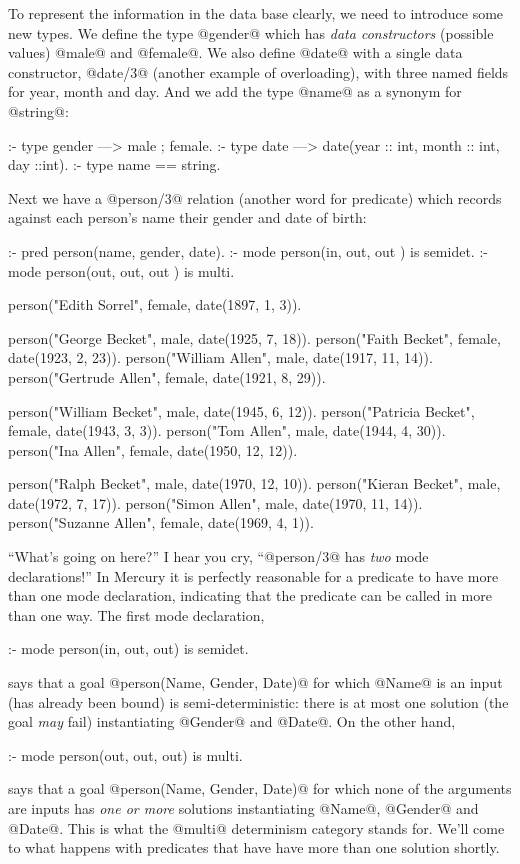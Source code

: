 To represent the information in the data base clearly, we need to introduce
some new types.  We define the type @gender@ which has \emph{data
constructors} (\ie possible values) @male@ and @female@.  We also
define @date@ with a single data constructor, @date/3@ (another
example of overloading), with three named fields for year, month and day.
And we add the type @name@ as a synonym for @string@:
\begin{myverbatim}
:- type gender ---> male ; female.
:- type date   ---> date(year :: int, month :: int, day ::int).
:- type name   ==   string.
\end{myverbatim}
Next we have a @person/3@ relation (another word for predicate) which
records against each person's name their gender and date of birth:
\begin{myverbatim}
:- pred person(name, gender, date).
:- mode person(in,   out,    out ) is semidet.
:- mode person(out,  out,    out ) is multi.

person("Edith Sorrel",      female, date(1897,  1,  3)).

person("George Becket",     male,   date(1925,  7, 18)).
person("Faith Becket",      female, date(1923,  2, 23)).
person("William Allen",     male,   date(1917, 11, 14)).
person("Gertrude Allen",    female, date(1921,  8, 29)).

person("William Becket",    male,   date(1945,  6, 12)).
person("Patricia Becket",   female, date(1943,  3,  3)).
person("Tom Allen",         male,   date(1944,  4, 30)).
person("Ina Allen",         female, date(1950, 12, 12)).

person("Ralph Becket",      male,   date(1970, 12, 10)).
person("Kieran Becket",     male,   date(1972,  7, 17)).
person("Simon Allen",       male,   date(1970, 11, 14)).
person("Suzanne Allen",     female, date(1969,  4,  1)).
\end{myverbatim}
``What's going on here?'' I hear you cry, ``@person/3@ has \emph{two} mode
declarations!''  In Mercury it is perfectly reasonable for a predicate to
have more than one mode declaration, indicating that the predicate can be
called in more than one way.  The first mode declaration,
\begin{myverbatim}
:- mode person(in, out, out) is semidet.
\end{myverbatim}
says that a goal @person(Name, Gender, Date)@ for which @Name@ is an input
(\ie has already been bound) is semi-deterministic: there is at most one
solution (\ie the goal \emph{may} fail) instantiating @Gender@ and @Date@.
On the other hand,
\begin{myverbatim}
:- mode person(out, out, out) is multi.
\end{myverbatim}
says that a goal @person(Name, Gender, Date)@ for which none of the
arguments are inputs has \emph{one or more} solutions instantiating @Name@,
@Gender@ and @Date@.  This is what the @multi@ determinism category stands
for.  We'll come to what happens with predicates that have have more than
one solution shortly.

